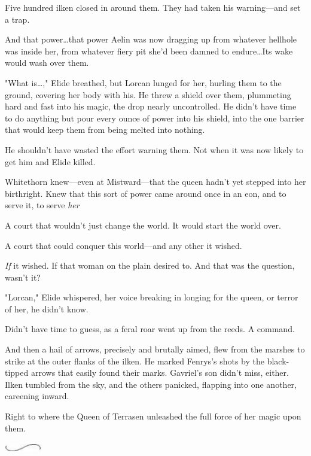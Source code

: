 Five hundred ilken closed in around them.
They had taken his warning---and set a trap.

And that power\ldots that power Aelin was now dragging up from whatever hellhole was inside her, from whatever fiery pit she'd been damned to endure\ldots Its wake would wash over them.

"What is\ldots ," Elide breathed, but Lorcan lunged for her, hurling them to the ground, covering her body with his.
He threw a shield over them, plummeting hard and fast into his magic, the drop nearly uncontrolled.
He didn't have time to do anything but pour every ounce of power into his shield, into the one barrier that would keep them from being melted into nothing.

He shouldn't have wasted the effort warning them.
Not when it was now likely to get him and Elide killed.

Whitethorn knew---even at Mistward---that the queen hadn't yet stepped into her birthright.
Knew that this sort of power came around once in an eon, and to serve it, to serve \emph{her} 

A court that wouldn't just change the world.
It would start the world over.

A court that could conquer this world---and any other it wished.

\emph{If} it wished.
If that woman on the plain desired to.
And that was the question, wasn't it?

"Lorcan," Elide whispered, her voice breaking in longing for the queen, or terror of her, he didn't know.

Didn't have time to guess, as a feral roar went up from the reeds.
A command.

And then a hail of arrows, precisely and brutally aimed, flew from the marshes to strike at the outer flanks of the ilken.
He marked Fenrys's shots by the black-tipped arrows that easily found their marks.
Gavriel's son didn't miss, either.
Ilken tumbled from the sky, and the others panicked, flapping into one another, careening inward.

Right to where the Queen of Terrasen unleashed the full force of her magic upon them.

\begin{center}
	\includegraphics[width=0.65in,height=0.13in]{images/seperator}
\end{center}

